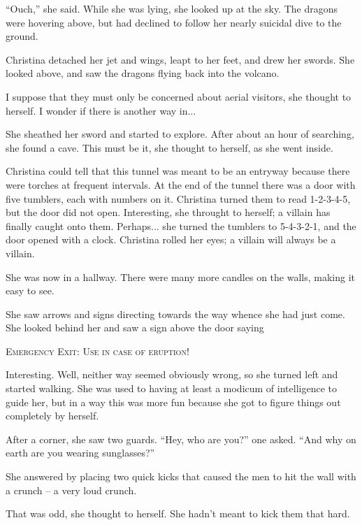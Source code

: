 \documentclass[showtrims,b6paper,draft,10pt]{memoir}
\begin{document}
``Ouch,'' she said.  While she was lying, she looked up at the sky.  The dragons were hovering above, but had declined to follow her nearly suicidal dive to the ground.

Christina detached her jet and wings, leapt to her feet, and drew her swords.  She looked above, and saw the dragons flying back into the volcano.

I suppose that they must only be concerned about aerial visitors, she thought to herself.  I wonder if there is another way in...

She sheathed her sword and started to explore.  After about an hour of searching, she found a cave.  This must be it, she thought to herself, as she went inside.

\timeskip
Christina could tell that this tunnel was meant to be an entryway because there were torches at frequent intervals.  At the end of the tunnel there was a door with five tumblers, each with numbers on it.  Christina turned them to read 1-2-3-4-5, but the door did not open.  Interesting, she throught to herself; a villain has finally caught onto them.  Perhaps... she turned the tumblers to 5-4-3-2-1, and the door opened with a clock.  Christina rolled her eyes;  a villain will always be a villain.

She was now in a hallway.  There were many more candles on the walls, making it easy to see.

She saw arrows and signs directing towards the way whence she had just come.  She looked behind her and saw a sign above the door saying

\begin{center}
\textsc{Emergency Exit:  Use in case of eruption!}
\end{center}

Interesting.  Well, neither way seemed obviously wrong, so she turned left and started walking.  She was used to having at least a modicum of intelligence to guide her, but in a way this was more fun because she got to figure things out completely by herself.

After a corner, she saw two guards.  ``Hey, who are you?'' one asked.  ``And why on earth are you wearing sunglasses?''

She answered by placing two quick kicks that caused the men to hit the wall with a crunch -- a very loud crunch.

That was odd, she thought to herself.  She hadn't meant to kick them that hard.
\end{document}
